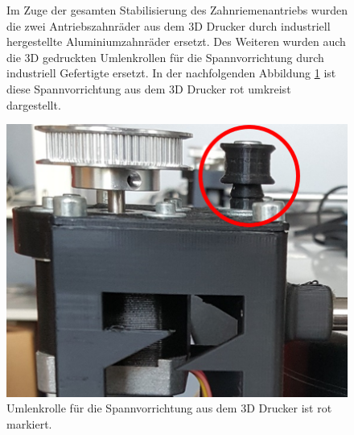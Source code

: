 \begin{figure} [h]

\begin{minipage}[t]{0.45\textwidth}
\vspace{0pt}
Im Zuge der gesamten Stabilisierung des Zahnriemenantriebs wurden die zwei Antriebszahnräder aus dem 3D Drucker durch industriell hergestellte Aluminiumzahnräder ersetzt. Des Weiteren wurden auch die 3D gedruckten Umlenkrollen für die Spannvorrichtung durch industriell Gefertigte ersetzt. In der nachfolgenden Abbildung \ref{HW_Umlenkrolle} ist diese Spannvorrichtung aus dem 3D Drucker rot umkreist dargestellt.
\end{minipage}
\hspace{0.1\textwidth}
\begin{minipage}[t]{0.4\textwidth}
\vspace{0pt}
\includegraphics[width=\textwidth]{images/HW_Umlenkrolle}
\caption{Umlenkrolle für die Spannvorrichtung aus dem 3D Drucker ist rot markiert.}
 \label{HW_Umlenkrolle}
\end{minipage}
\end{figure}

